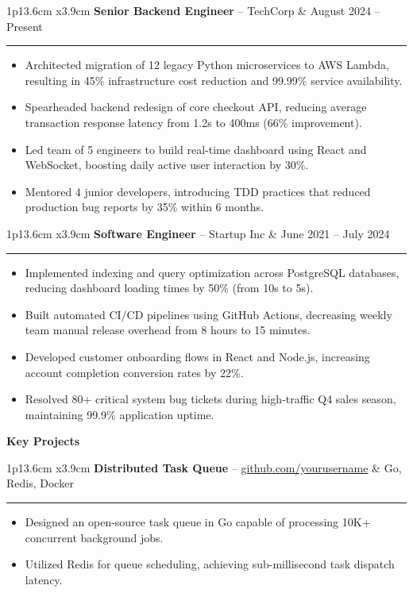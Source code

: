 \documentclass[10pt,a4paper]{article}
\newcommand{\cvsection}[1]{
    \vspace{8pt}
    \begin{center}
        \large\textcolor{sectcol}{\textbf{#1}}
    \end{center}
    \vspace{-4pt}
}
\newcommand{\cvevent}[3]{
    \begin{tabular*}{1\textwidth}{p{13.6cm} x{3.9cm}}
        \textbf{#2} -- \textcolor{bgcol}{#3} & \vspace{2.5pt}\textcolor{sectcol}{#1}
    \end{tabular*}
    \vspace{-8pt}
    \textcolor{softcol}{\hrule}
    \vspace{4pt}
}
\begin{document}
\cvevent{August 2024 -- Present}{Senior Backend Engineer}{TechCorp}
\begin{itemize}
    \item Architected migration of 12 legacy Python microservices to AWS Lambda, resulting in 45\% infrastructure cost reduction and 99.99\% service availability.
    \item Spearheaded backend redesign of core checkout API, reducing average transaction response latency from 1.2s to 400ms (66\% improvement).
    \item Led team of 5 engineers to build real-time dashboard using React and WebSocket, boosting daily active user interaction by 30\%.
    \item Mentored 4 junior developers, introducing TDD practices that reduced production bug reports by 35\% within 6 months.
\end{itemize}
\vspace{6pt}

\cvevent{June 2021 -- July 2024}{Software Engineer}{Startup Inc}
\begin{itemize}
    \item Implemented indexing and query optimization across PostgreSQL databases, reducing dashboard loading times by 50\% (from 10s to 5s).
    \item Built automated CI/CD pipelines using GitHub Actions, decreasing weekly team manual release overhead from 8 hours to 15 minutes.
    \item Developed customer onboarding flows in React and Node.js, increasing account completion conversion rates by 22\%.
    \item Resolved 80+ critical system bug tickets during high-traffic Q4 sales season, maintaining 99.9\% application uptime.
\end{itemize}
\vspace{4pt}

\cvsection{Key Projects}

\cvevent{Go, Redis, Docker}{Distributed Task Queue}{\href{https://github.com/yourusername}{github.com/yourusername}}
\begin{itemize}
    \item Designed an open-source task queue in Go capable of processing 10K+ concurrent background jobs.
    \item Utilized Redis for queue scheduling, achieving sub-millisecond task dispatch latency.
\end{itemize}
\vspace{6pt}
\end{document}
